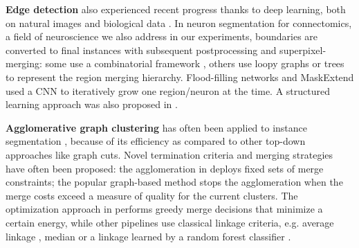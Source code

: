 \textbf{Edge detection} also experienced recent progress thanks to deep learning, both on natural images \cite{Gao_2019_ICCV,liu2018affinity,xie2015holistically,kokkinos2015pushing} and biological data \cite{lee2017superhuman,schmidt2018cell,meirovitch2016multi,ciresan2012deep}. In neuron segmentation for connectomics, a field of neuroscience we also address in our experiments, boundaries are converted to final instances with subsequent postprocessing and superpixel-merging:
some use a combinatorial framework \cite{beier2017multicut}, others use loopy graphs \cite{kaynig2015large,krasowski2015improving} or trees \cite{meirovitch2016multi,liu2016sshmt,liu2014modular,funke2015learning,uzunbas2016efficient} to represent the region merging hierarchy. Flood-filling networks \cite{januszewski2018high} and MaskExtend \cite{meirovitch2016multi} used a CNN to iteratively grow one region/neuron at the time.
A structured learning approach was also proposed in \cite{funke2018large,turaga2009maximin}.

\textbf{Agglomerative graph clustering} has often been applied to instance segmentation \cite{arbelaez2011contour,ren2013image,liu2016image,salembier2000binary}, because of its efficiency as compared to other top-down approaches like graph cuts. 
Novel termination criteria and merging strategies have often been proposed: the agglomeration in \cite{malmberg2011generalized} deploys fixed sets of merge constraints; 
the popular graph-based method \cite{felzenszwalb2004efficient} stops the agglomeration when the merge costs exceed a measure of quality for the current clusters. 
The optimization approach in \cite{kiran2014global} performs greedy merge decisions that minimize a certain energy, while other pipelines use classical linkage criteria, e.g. average linkage \cite{liu2018affinity,lee2017superhuman}, median \cite{funke2018large} or a linkage learned by a random forest classifier \cite{nunez2013machine,knowles2016rhoananet}.

